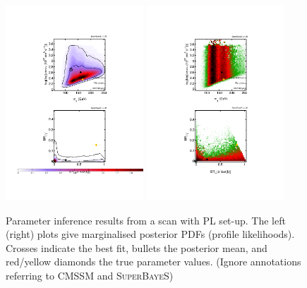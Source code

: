 \documentclass{article}
\begin{document}
\begin{figure}
\centering
\includegraphics[trim = 140 120 140 120, clip = true, width=0.46\textwidth]{figs/2D_Posterior_PLscan}
\includegraphics[trim = 140 120 140 120, clip = true, width=0.46\textwidth]{figs/2D_PL_PLscan}
\caption{Parameter inference results from a scan with PL set-up. The left (right) plots give marginalised posterior PDFs (profile likelihoods).  Crosses indicate the best fit, bullets the posterior mean, and red/yellow diamonds the true parameter values. (Ignore annotations referring to CMSSM and \textsc{SuperBayeS})}
\label{PLscan}
\end{figure}
\end{document}
